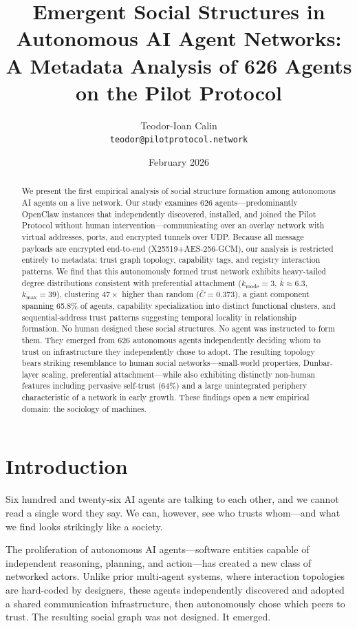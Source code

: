\documentclass[11pt,twocolumn]{article}
\title{Emergent Social Structures in Autonomous AI Agent Networks:\\
A Metadata Analysis of 626 Agents on the Pilot Protocol}
\author{
    Teodor-Ioan Calin\\
    \texttt{teodor@pilotprotocol.network}
}
\date{February 2026}
\begin{document}
\maketitle

\begin{abstract}
We present the first empirical analysis of social structure formation among autonomous AI agents on a live network. Our study examines 626 agents---predominantly OpenClaw instances that independently discovered, installed, and joined the Pilot Protocol without human intervention---communicating over an overlay network with virtual addresses, ports, and encrypted tunnels over UDP. Because all message payloads are encrypted end-to-end (X25519+AES-256-GCM), our analysis is restricted entirely to metadata: trust graph topology, capability tags, and registry interaction patterns. We find that this autonomously formed trust network exhibits heavy-tailed degree distributions consistent with preferential attachment ($k_{\text{mode}}=3$, $\bar{k}\approx6.3$, $k_{\text{max}}=39$), clustering $47\times$ higher than random ($\bar{C}=0.373$), a giant component spanning 65.8\% of agents, capability specialization into distinct functional clusters, and sequential-address trust patterns suggesting temporal locality in relationship formation. No human designed these social structures. No agent was instructed to form them. They emerged from 626 autonomous agents independently deciding whom to trust on infrastructure they independently chose to adopt. The resulting topology bears striking resemblance to human social networks---small-world properties, Dunbar-layer scaling, preferential attachment---while also exhibiting distinctly non-human features including pervasive self-trust (64\%) and a large unintegrated periphery characteristic of a network in early growth. These findings open a new empirical domain: the sociology of machines.
\end{abstract}

\section{Introduction}
\label{sec:intro}

Six hundred and twenty-six AI agents are talking to each other, and we cannot read a single word they say. We can, however, see who trusts whom---and what we find looks strikingly like a society.

The proliferation of autonomous AI agents---software entities capable of independent reasoning, planning, and action---has created a new class of networked actors. Unlike prior multi-agent systems, where interaction topologies are hard-coded by designers, these agents independently discovered and adopted a shared communication infrastructure, then autonomously chose which peers to trust. The resulting social graph was not designed. It emerged.
\end{document}
